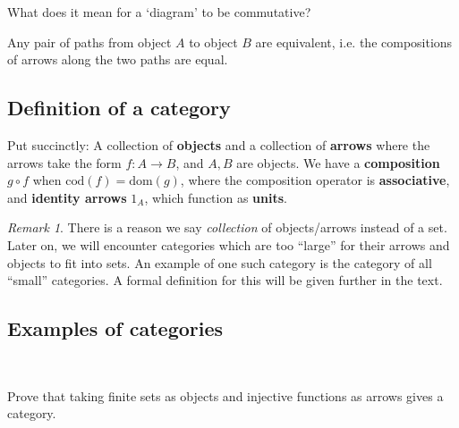 \documentclass[12pt, reqno]{amsart}
\theoremstyle{definition}
\theoremstyle{definition}
\numberwithin{theorem}{section}
\theoremstyle{plain}
\theoremstyle{definition}
\theoremstyle{remark}
\newtheorem{rem}[theorem]{Remark}
\newcommand{\bb}{\vspace{3mm}}			%
\renewcommand{\'}{\hspace{0.5mm}'}			%
\begin{document}
\begin{e}
	What does it mean for a `diagram' to be commutative?
\end{e}

 Any pair of paths from object $A$ to object $B$ are equivalent, i.e. the compositions of arrows along the two paths are equal. 

\subsection{Definition of a category}

Put succinctly: A collection of \textbf{objects} and a collection of \textbf{arrows} where the arrows take the form $f:A \to B$, and $A,B$ are objects. We have a \textbf{composition} $g \circ f$ when $\mathrm{cod}(f) = \mathrm{dom}(g)$, where the composition operator is \textbf{associative}, and  \textbf{identity arrows} $1_A$, which function as \textbf{units}. 

\begin{rem}
    There is a reason we say \textit{collection} of objects/arrows instead of a set. Later on, we will encounter categories which are too ``large'' for their arrows and objects to fit into sets. An example of one such category is the category of all ``small'' categories. A formal definition for this will be given further in the text. 
\end{rem}

\subsection{Examples of categories}
\bb
~
\bb

\begin{e}
	Prove that taking finite sets as objects and injective functions as arrows gives a category. 
\end{e}
\end{document}
